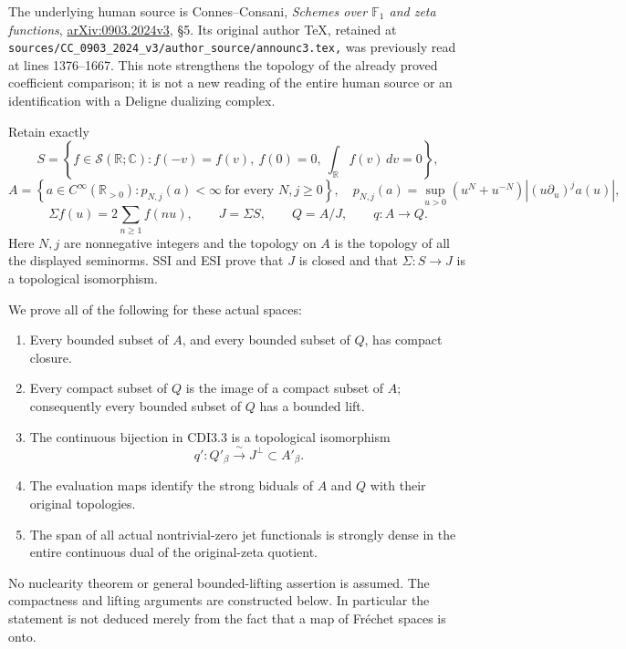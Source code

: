 The underlying human source is Connes--Consani, \emph{Schemes over
\(\mathbb F_1\) and zeta functions},
\href{https://arxiv.org/abs/0903.2024v3}{arXiv:0903.2024v3}, §5. Its
original author TeX, retained at
\nolinkurl{sources/CC_0903_2024_v3/author_source/announc3.tex,} was
previously read at lines 1376--1667. This note strengthens the topology
of the already proved coefficient comparison; it is not a new reading of
the entire human source or an identification with a Deligne dualizing
complex.

Retain exactly \[
S=\left\{f\in\mathcal S(\mathbb R;\mathbb C):
f(-v)=f(v),\ f(0)=0,\ \int_{\mathbb R}f(v)\,dv=0\right\},
\] \[
A=\left\{a\in C^\infty(\mathbb R_{>0}):
p_{N,j}(a)<\infty\ \text{for every }N,j\ge0\right\},
\quad
p_{N,j}(a)=\sup_{u>0}(u^N+u^{-N})|(u\partial_u)^ja(u)|,
\] \[
\Sigma f(u)=2\sum_{n\ge1}f(nu),\qquad
J=\Sigma S,\qquad Q=A/J,\qquad q:A\longrightarrow Q.
\tag{SDT0.1}
\] Here \(N,j\) are nonnegative integers and the topology on \(A\) is
the topology of all the displayed seminorms. SSI and ESI prove that
\(J\) is closed and that \(\Sigma:S\to J\) is a topological isomorphism.

We prove all of the following for these actual spaces:

\begin{enumerate}
\def\labelenumi{\arabic{enumi}.}
\tightlist
\item
  Every bounded subset of \(A\), and every bounded subset of \(Q\), has
  compact closure.
\item
  Every compact subset of \(Q\) is the image of a compact subset of
  \(A\); consequently every bounded subset of \(Q\) has a bounded lift.
\item
  The continuous bijection in CDI3.3 is a topological isomorphism \[
  q':Q'_\beta\xrightarrow{\ \sim\ }J^\perp\subset A'_\beta.
  \tag{SDT0.2}
  \]
\item
  The evaluation maps identify the strong biduals of \(A\) and \(Q\)
  with their original topologies.
\item
  The span of all actual nontrivial-zero jet functionals is strongly
  dense in the entire continuous dual of the original-zeta quotient.
\end{enumerate}

No nuclearity theorem or general bounded-lifting assertion is assumed.
The compactness and lifting arguments are constructed below. In
particular the statement is not deduced merely from the fact that a map
of Fréchet spaces is onto.

